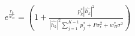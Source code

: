 \documentclass[preview]{standalone}
\begin{document}
\begin{align*}
e^{\frac{r_k}{w_B^\ast}} = \left(1 + \frac{p_k^\ast \left|\hat{h_k}\right|^2}{\left|\hat{h_k}\right|^2 \sum_{j=1}^{K-1} {p_j^\ast} + P \sigma_{\epsilon}^2 + w_B^\ast \sigma^2}\right)
\end{align*}
\end{document}
